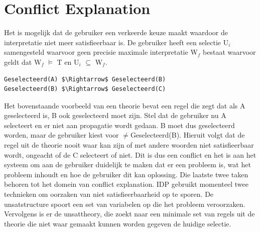 \section{Conflict Explanation}
Het is mogelijk dat de gebruiker een verkeerde keuze maakt waardoor de interpretatie niet meer satisfieerbaar is. De gebruiker heeft een selectie U$_{i}$ samengesteld waarvoor geen precisie maximale interpretatie W$_{f}$ bestaat waarvoor geldt dat W$_{f}$ $\models$ T en U$_{i}$ $\subseteq$ W$_{f}$.
\lstset{basicstyle=\scriptsize}
\begin{lstlisting}[mathescape]
Geselecteerd(A) $\Rightarrow$ Geselecteerd(B)
Geselecteerd(B) $\Rightarrow$ Geselecteerd(C)
\end{lstlisting}
Het bovenstaande voorbeeld van een theorie bevat een regel die zegt dat als A geselecteerd is, B ook geselecteerd moet zijn. Stel dat de gebruiker nu A selecteert en er niet aan propagatie wordt gedaan. B moet dus geselecteerd worden, maar de gebruiker kiest voor $\neq$Geselecteerd(B). Hieruit volgt dat de regel uit de theorie nooit waar kan zijn of met andere woorden niet satisfieerbaar wordt, ongeacht of de C selecteert of niet. Dit is dus een conflict en het is aan het systeem om aan de gebruiker duidelijk te maken dat er een probleem is, wat het probleem inhoudt en hoe de gebruiker dit kan oplossing. Die laatste twee taken behoren tot het domein van conflict explanation. IDP gebruikt momenteel twee technieken om oorzaken van niet satisfieerbaarheid op te sporen. De unsatstructure spoort een set van variabelen op die het probleem veroorzaken. Vervolgens is er de unsattheory, die zoekt naar een minimale set van regels uit de theorie die niet waar gemaakt kunnen worden gegeven de huidige selectie.

